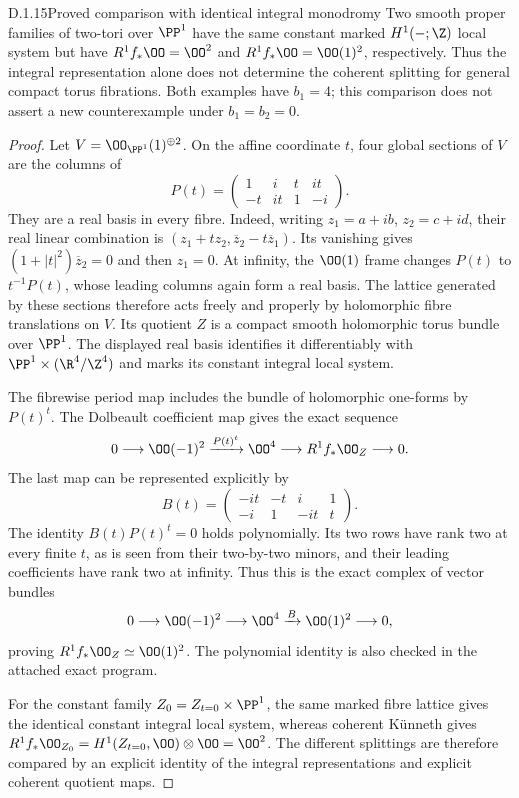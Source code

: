 \begin{idstatement}{D.1.15}{Proved comparison with identical integral monodromy}
\label{st:D.1.15}
Two smooth proper families of two-tori over $\PP^1$ have the same
constant marked $H^1(-;\Z)$ local system but have
$R^1f_*\OO=\OO^2$ and $R^1f_*\OO=\OO(1)^2$, respectively.
Thus the integral representation alone does not determine the
coherent splitting for general compact torus fibrations. Both
examples have $b_1=4$; this comparison does not assert a new
counterexample under $b_1=b_2=0$.
\end{idstatement}
\begin{proof}
Let $V=\OO_{\PP^1}(1)^{\oplus2}$. On the affine coordinate $t$,
four global sections of $V$ are the columns of
\[
P(t)=\begin{pmatrix}1&i&t&it\\-t&it&1&-i\end{pmatrix}.
\]
They are a real basis in every fibre. Indeed, writing
$z_1=a+ib$, $z_2=c+id$, their real linear combination is
$(z_1+t z_2,\overline z_2-t\overline z_1)$.
Its vanishing gives $(1+|t|^2)\overline z_2=0$ and then $z_1=0$.
At infinity, the $\OO(1)$ frame changes $P(t)$ to $t^{-1}P(t)$,
whose leading columns again form a real basis. The lattice
generated by these sections therefore acts freely and properly by
holomorphic fibre translations on $V$. Its quotient $Z$ is a
compact smooth holomorphic torus bundle over $\PP^1$.
The displayed real basis identifies it differentiably with
$\PP^1\times(\R^4/\Z^4)$ and marks its constant integral local
system.

The fibrewise period map includes the bundle of holomorphic
one-forms by $P(t)^t$. The Dolbeault coefficient map gives the
exact sequence
\[
0\longrightarrow\OO(-1)^2
 \xrightarrow{P(t)^t}\OO^4
 \longrightarrow R^1f_*\OO_Z\longrightarrow0.
\]
The last map can be represented explicitly by
\[
B(t)=\begin{pmatrix}-it&-t&i&1\\-i&1&-it&t\end{pmatrix}.
\]
The identity $B(t)P(t)^t=0$ holds polynomially. Its two rows have
rank two at every finite $t$, as is seen from their two-by-two
minors, and their leading coefficients have rank two at infinity.
Thus this is the exact complex of vector bundles
\[
0\longrightarrow\OO(-1)^2\longrightarrow\OO^4
 \xrightarrow{B}\OO(1)^2\longrightarrow0,
\]
proving $R^1f_*\OO_Z\simeq\OO(1)^2$. The polynomial identity is
also checked in the attached exact program.

For the constant family $Z_0=Z_{t=0}\times\PP^1$, the same
marked fibre lattice gives the identical constant integral local
system, whereas coherent K\"unneth gives
$R^1f_*\OO_{Z_0}=H^1(Z_{t=0},\OO)\otimes\OO=\OO^2$.
The different splittings are therefore compared by an explicit
identity of the integral representations and explicit coherent
quotient maps.
\end{proof}


